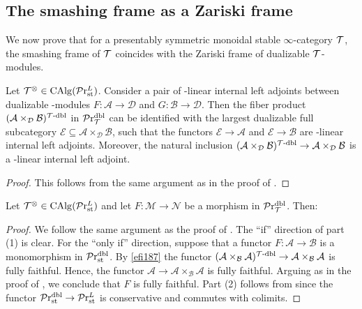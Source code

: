 \documentclass[10pt,a4paper,oneside]{article}
\begin{document}
\subsection{The smashing frame as a Zariski frame}
We now prove that for a presentably symmetric monoidal stable $\infty$-category $\mathcal{T}$, the smashing frame of $\mathcal{T}$ coincides with the Zariski frame of dualizable $\mathcal{T}$-modules.

\begin{lem}\label{efi187}
Let $\mathcal{T}^\otimes\in \operatorname{CAlg}(\mathcal{P}\mathrm{r}_{\operatorname{st}}^L)$. Consider a pair of \mct-linear internal left adjoints between dualizable \mct-modules $F: \mathcal{A} \rightarrow \mathcal{D}$ and $G: \mathcal{B} \rightarrow \mathcal{D}$. Then the fiber product $(\mathcal{A} \times_{\mathcal{D}} \mathcal{B})^{\mathcal{T}\text{-}\mathrm{dbl}}$ in $\mathcal{P}\mathrm{r}_{\mathcal{T}}^{\operatorname{dbl}}$ can be identified with the  largest dualizable full subcategory $\mathcal{E} \subseteq \mathcal{A} \times_{\mathcal{D}} \mathcal{B}$, such that the functors $\mathcal{E} \rightarrow \mathcal{A}$ and $\mathcal{E} \rightarrow \mathcal{B}$ are \mct-linear internal left adjoints. Moreover, the natural inclusion $(\mathcal{A} \times_{\mathcal{D}} \mathcal{B})^{\mathcal{T}\text{-}\mathrm{dbl}} \rightarrow \mathcal{A} \times_{\mathcal{D}} \mathcal{B}$ is a \mct-linear internal left adjoint. 
\end{lem}

\begin{proof}
This follows from the same argument as in the proof of \cite[Proposition 1.87]{efimov2024k}.
\end{proof}

\begin{prop}\label{cdblmono}
Let $\mathcal{T}^\otimes\in \operatorname{CAlg}(\mathcal{P}\mathrm{r}_{\operatorname{st}}^L)$ and let $F: \mathcal{M} \rightarrow \mathcal{N}$ be a morphism in $\mathcal{P}\mathrm{r}_{\mathcal{T}}^{\operatorname{dbl}}$. Then:
\end{prop}
\begin{proof}
We follow the same argument as the proof of \cite[Proposition A.3]{efimov2024k}. The ``if'' direction of part (1) is clear. For the ``only if'' direction, suppose that a functor $F: \mathcal{A} \rightarrow \mathcal{B}$ is a monomorphism in $\mathcal{P}\mathrm{r}_{\operatorname{st}}^{\operatorname{dbl}}$. By \cref{efi187} the functor $(\mathcal{A} \times_{\mathcal{B}} \mathcal{A})^{\mathcal{T}\text{-}\mathrm{dbl}}\rightarrow \mathcal{A} \times_{\mathcal{B}} \mathcal{A}$ is fully faithful. Hence, the functor $\mathcal{A} \rightarrow \mathcal{A} \times_{\mathcal{B}} \mathcal{A}$ is fully faithful. Arguing as in the proof of \cite[Proposition A.1]{efimov2024k}, we conclude that $F$ is fully faithful. Part (2) follows from \cite[Proposition A.1]{efimov2024k} since the functor $\mathcal{P}\mathrm{r}_{\operatorname{st}}^{\operatorname{dbl}} \rightarrow \mathcal{P}\mathrm{r}_{\operatorname{st}}^L$ is conservative and commutes with colimits.
\end{proof}
\end{document}
